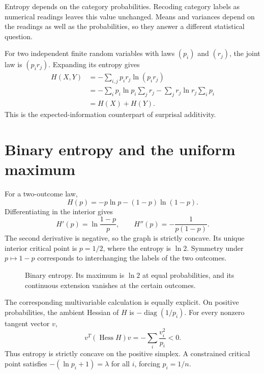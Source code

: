 \documentclass[11pt,oneside,openany]{book}
\theoremstyle{definition}
\theoremstyle{remark}
\newcommand{\diag}{\operatorname{diag}}
\numberwithin{equation}{chapter}
\begin{document}
Entropy depends on the category probabilities. Recoding category labels as numerical readings leaves this value unchanged. Means and variances depend on the readings as well as the probabilities, so they answer a different statistical question.

For two independent finite random variables with laws $(p_i)$ and $(r_j)$, the joint law is $(p_ir_j)$. Expanding its entropy gives
\begin{align*}
H(X,Y)&=-\sum_{i,j}p_ir_j\ln(p_ir_j)\\
&=-\sum_i p_i\ln p_i\sum_jr_j-\sum_jr_j\ln r_j\sum_ip_i\\
&=H(X)+H(Y).
\end{align*}
This is the expected-information counterpart of surprisal additivity.

\section{Binary entropy and the uniform maximum}
For a two-outcome law,
\[
H(p)=-p\ln p-(1-p)\ln(1-p).
\]
Differentiating in the interior gives
\begin{equation}\label{eq:binaryentropyderivatives}
H'(p)=\ln\frac{1-p}{p},\qquad
H''(p)=-\frac1{p(1-p)}.
\end{equation}
The second derivative is negative, so the graph is strictly concave. Its unique interior critical point is $p=1/2$, where the entropy is $\ln2$. Symmetry under $p\mapsto1-p$ corresponds to interchanging the labels of the two outcomes.

\begin{figure}[htbp]
\centering
{}
\caption{Binary entropy. Its maximum is $\ln2$ at equal probabilities, and its continuous extension vanishes at the certain outcomes.}
\end{figure}

The corresponding multivariable calculation is equally explicit. On positive probabilities, the ambient Hessian of $H$ is $-\diag(1/p_i)$. For every nonzero tangent vector $v$,
\[
v^T(\operatorname{Hess}H)v=-\sum_i\frac{v_i^2}{p_i}<0.
\]
Thus entropy is strictly concave on the positive simplex. A constrained critical point satisfies $-(\ln p_i+1)=\lambda$ for all $i$, forcing $p_i=1/n$.
\end{document}
